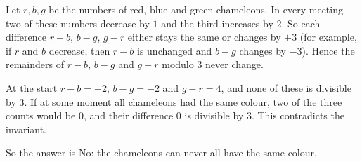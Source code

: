 Let $r,b,g$ be the numbers of red, blue and green chameleons. In every meeting two of these numbers decrease by $1$ and the third increases by $2$. So each difference $r-b$, $b-g$, $g-r$ either stays the same or changes by $\pm3$ (for example, if $r$ and $b$ decrease, then $r-b$ is unchanged and $b-g$ changes by $-3$). Hence the remainders of $r-b$, $b-g$ and $g-r$ modulo $3$ never change.

At the start $r-b=-2$, $b-g=-2$ and $g-r=4$, and none of these is divisible by $3$. If at some moment all chameleons had the same colour, two of the three counts would be $0$, and their difference $0$ is divisible by $3$. This contradicts the invariant.

So the answer is $\boxed{\text{No}}$: the chameleons can never all have the same colour.
